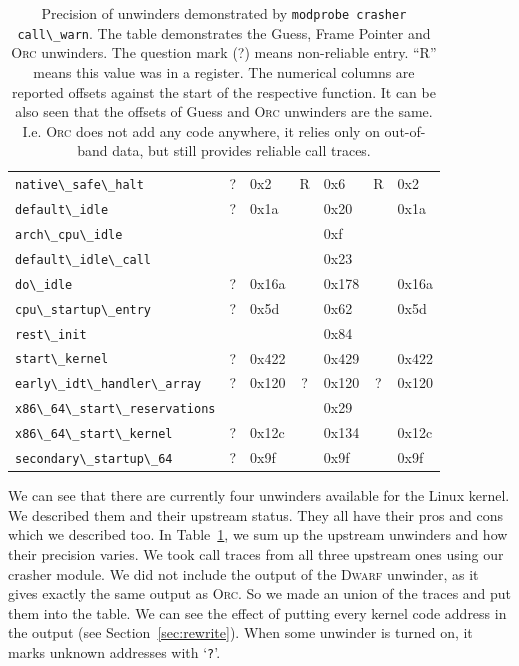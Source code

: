 \documentclass[10pt]{llncs}
\newcommand{\code}[2][]{\lstinline[columns=fullflexible, #1]$#2$}
\newcommand{\dwarf}{\textsc{Dwarf}\xspace}
\newcommand{\orc}{\textsc{Orc}\xspace}
\begin{document}
\begin{table}[tb!]
\begin{center}
\begin{tabular}{|l||c|l|c|l|c|l|}
      \code{native\_safe\_halt}	 & ? & 0x2   & R & 0x6   & R & 0x2 \\
      \code{default\_idle}	 & ? & 0x1a  &   & 0x20  &   & 0x1a \\
      \rowcolor[gray]{.9}
      \code{arch\_cpu\_idle}	 &   &       &   & 0xf   &   & \\
      \rowcolor[gray]{.9}
      \code{default\_idle\_call} &   &       &   & 0x23  &   & \\
      \code{do\_idle}		 & ? & 0x16a &   & 0x178 &   & 0x16a \\
      \code{cpu\_startup\_entry} & ? & 0x5d  &   & 0x62  &   & 0x5d \\
      \rowcolor[gray]{.9}
      \code{rest\_init}		 &   &       &   & 0x84  &   & \\
      \code{start\_kernel}	 & ? & 0x422 &   & 0x429 &   & 0x422 \\
      \rowcolor[gray]{.9}
      \code{early\_idt\_handler\_array} & ? & 0x120 & ? & 0x120 & ? & 0x120 \\
      \rowcolor[gray]{.9}
      \code{x86\_64\_start\_reservations} &  &  &  & 0x29 &  & \\
      \code{x86\_64\_start\_kernel} & ? & 0x12c &  & 0x134 &  & 0x12c \\
      \code{secondary\_startup\_64} & ? & 0x9f &  & 0x9f &  & 0x9f \\ \hline
    \end{tabular}
  \end{center}
    \caption{Precision of unwinders demonstrated by \code{modprobe crasher
    call\_warn}. The table demonstrates the Guess, Frame Pointer and \orc
    unwinders. The question mark (?) means non-reliable entry. ``R'' means
    this value was in a register. The numerical columns are reported offsets
    against the start of the respective function. It can be also seen that the
    offsets of Guess and \orc unwinders are the same. I.e. \orc does not add
    any code anywhere, it relies only on out-of-band data, but still provides
    reliable call traces.}
  \label{tab:instr}
\end{table}

We can see that there are currently four unwinders available for the Linux
kernel. We described them and their upstream status. They all have their pros
and cons which we described too. In Table~\ref{tab:instr}, we sum up the
upstream unwinders and how their precision varies. We took call traces from
all three upstream ones using our crasher module. We did not include the
output of the \dwarf unwinder, as it gives exactly the same output as \orc. So
we made an union of the traces and put them into the table. We can see the
effect of putting every kernel code address in the output (see
Section~\ref{sec:rewrite}). When some unwinder is turned on, it marks unknown
addresses with `\code{?}'.
\end{document}
